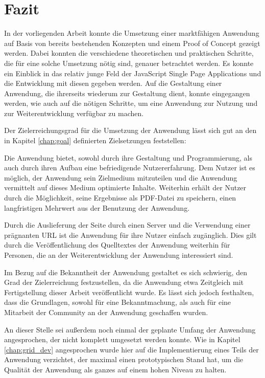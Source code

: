 \chapter{Fazit}
\thispagestyle{fancy}

In der vorliegenden Arbeit konnte die Umsetzung einer marktfähigen Anwendung auf Basis von bereits bestehenden Konzepten und einem Proof of Concept gezeigt werden.
Dabei konnten die verschiedene theoretischen und praktischen Schritte, die für eine solche Umsetzung nötig sind, genauer betrachtet werden.
Es konnte ein Einblick in das relativ junge Feld der JavaScript Single Page Applications und die Entwicklung mit diesen gegeben werden. Auf die Gestaltung einer Anwendung, die ihrerseits wiederum zur Gestaltung dient, konnte eingegangen werden, wie auch auf die nötigen Schritte, um eine Anwendung zur Nutzung und zur Weiterentwicklung verfügbar zu machen.

Der Zielerreichungsgrad für die Umsetzung der Anwendung lässt sich gut an den in Kapitel \ref{chap:goal} definierten Zielsetzungen feststellen:

Die Anwendung bietet, sowohl durch ihre Gestaltung und Programmierung, als auch durch ihren Aufbau eine befriedigende Nutzererfahrung. Dem Nutzer ist es möglich, der Anwendung sein Zielmedium mitzuteilen und die Anwendung vermittelt auf dieses Medium optimierte Inhalte. Weiterhin erhält der Nutzer durch die Möglichkeit, seine Ergebnisse als PDF-Datei zu speichern, einen langfristigen Mehrwert aus der Benutzung der Anwendung.

Durch die Auslieferung der Seite durch einen Server und die Verwendung einer prägnanten URL ist die Anwendung für ihre Nutzer einfach zugänglich. Dies gilt durch die Veröffentlichung des Quelltextes der Anwendung weiterhin für Personen, die an der Weiterentwicklung der Anwendung interessiert sind.

Im Bezug auf die Bekanntheit der Anwendung gestaltet es sich schwierig, den Grad der Zielerreichung festzustellen, da die Anwendung etwa Zeitgleich mit Fertigstellung dieser Arbeit veröffentlicht wurde.
Es lässt sich jedoch festhalten, dass die Grundlagen, sowohl für eine Bekanntmachung, als auch für eine Mitarbeit der Community an der Anwendung geschaffen wurden.

An dieser Stelle sei außerdem noch einmal der geplante Umfang der Anwendung angesprochen, der nicht komplett umgesetzt werden konnte.
Wie in Kapitel \ref{chap:grid_dev} angesprochen wurde hier auf die Implementierung eines Teils der Anwendung verzichtet, der maximal einen prototypischen Stand hat, um die Qualität der Anwendung als ganzes auf einem hohen Niveau zu halten.

